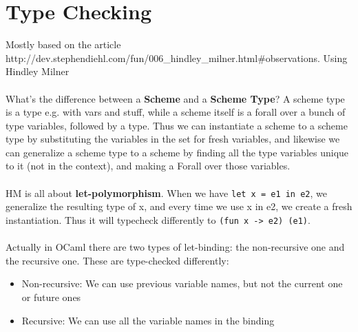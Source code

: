 \documentclass{report}
\newcommand{\camlinline}{\texttt}
\begin{document}
\section{Type Checking}
Mostly based on the article http://dev.stephendiehl.com/fun/006\_hindley\_milner.html\#observations. Using Hindley Milner
\\\\
What's the difference between a \textbf{Scheme} and a \textbf{Scheme Type}? A scheme type is a type e.g. with vars and stuff, while a scheme itself is a forall over a bunch of type variables, followed by a type. Thus we can instantiate a scheme to a scheme type by substituting the variables in the set for fresh variables, and likewise we can generalize a scheme type to a scheme by finding all the type variables unique to it (not in the context), and making a Forall over those variables.
\\\\
HM is all about \textbf{let-polymorphism}. When we have \camlinline{let x = e1 in e2}, we generalize the resulting type of x, and every time we use x in e2, we create a fresh instantiation. Thus it will typecheck differently to \camlinline{(fun x -> e2) (e1)}.
\\\\
Actually in OCaml there are two types of let-binding: the non-recursive one and the recursive one. These are type-checked differently:
\begin{itemize}
	\item Non-recursive: We can use previous variable names, but not the current one or future ones
	\item Recursive: We can use all the variable names in the binding
\end{itemize}
\end{document}
